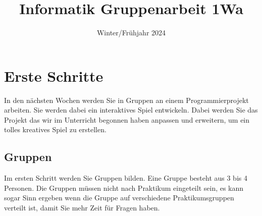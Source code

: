 \documentclass[11pt,a4paper]{report}
\title{Informatik Gruppenarbeit 1Wa}
\date{Winter/Frühjahr 2024}
\begin{document}
\maketitle

\newpage
\section{Erste Schritte}

In den nächsten Wochen werden Sie in Gruppen an einem Programmierprojekt
arbeiten. Sie werden dabei ein interaktives Spiel entwickeln. Dabei werden Sie
das Projekt das wir im Unterricht begonnen haben anpassen und erweitern, um ein
tolles kreatives Spiel zu erstellen.

\subsection{Gruppen}

Im ersten Schritt werden Sie Gruppen bilden. Eine Gruppe besteht aus 3 bis 4
Personen. Die Gruppen müssen nicht nach Praktikum eingeteilt sein, es kann
sogar Sinn ergeben wenn die Gruppe auf verschiedene Praktikumsgruppen verteilt
ist, damit Sie mehr Zeit für Fragen haben.





\end{document}
